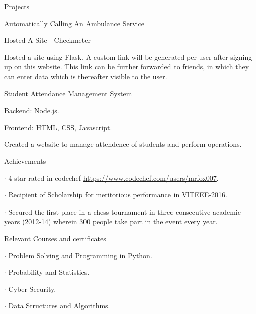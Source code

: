 \documentclass{resume} %
\begin{document}
\begin{rSection}{Projects}
\begin{rSubsection}{ Automatically Calling An Ambulance Service}{}{}
\end{rSubsection}


\begin{rSubsection}{ Hosted A Site - Checkmeter}{}{}

\item Hosted a site using Flask. A custom link will be generated per user after signing up on this website. This link can be further forwarded to friends, in which they can enter data which is thereafter visible to the user.

\end{rSubsection}

\begin{rSubsection}{ Student Attendance Management System}{}{}

    \item Backend: Node.js.
    \item Frontend: HTML, CSS, Javascript.
    \item Created a website to manage attendence of students and perform operations.

\end{rSubsection}

\end{rSection}



\begin{rSection}{Achievements} \itemsep -5pt
    \item $\cdot$ 4 star rated in codechef \url{https://www.codechef.com/users/mrfox007}.
    \item $\cdot$ Recipient of Scholarship for meritorious performance in VITEEE-2016.
    \item $\cdot$ Secured the first place in a chess tournament in three consecutive academic years (2012-14) wherein \phantom{x}300 people take part in the event every year.
\end{rSection}

\begin{rSection}{Relevant Courses and certificates} \itemsep -4pt \topmargin -50pt
    \item $\cdot$ Problem Solving and Programming in Python.
    \item $\cdot$ Probability and Statistics.
    \item $\cdot$ Cyber Security.
    \item $\cdot$ Data Structures and Algorithms.
\end{rSection}
\end{document}
